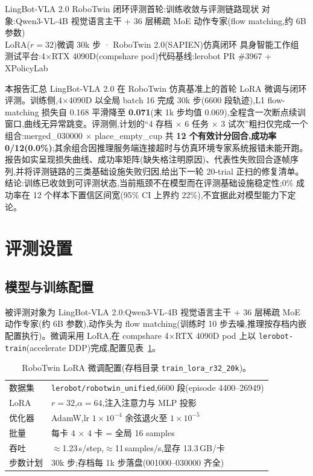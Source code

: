 \documentclass[11pt]{ctexart}
\begin{document}
{LingBot-VLA 2.0 RoboTwin 闭环评测首轮:训练收敛与评测链路现状}
{对象:Qwen3-VL-4B 视觉语言主干 + 36 层稀疏 MoE 动作专家(flow matching,约 6B 参数)\\ LoRA($r{=}32$)微调 30k 步 · RoboTwin 2.0(SAPIEN)仿真闭环}
{具身智能工作组 \quad 测试平台:4$\times$RTX 4090D(compshare pod)\quad 代码基线:lerobot PR \#3967 + XPolicyLab}

\begin{cnabstract}
本报告汇总 LingBot-VLA 2.0 在 RoboTwin 仿真基准上的首轮 LoRA 微调与闭环评测。训练侧,4$\times$4090D 以全局 batch 16 完成 30k 步(6600 段轨迹),L1 flow-matching 损失自 0.168 平滑降至 \textbf{0.071}(末 1k 步均值 0.069),全程含一次断点续训窗口,曲线无异常跳变。评测侧,计划的``4 存档 $\times$ 6 任务 $\times$ 3 试次''粗扫仅完成一个组合:merged\_030000 $\times$ place\_empty\_cup 共 \textbf{12 个有效计分回合,成功率 0/12(0.0\%)};其余组合因推理服务端连接超时与仿真环境专家系统报错未能开跑。报告如实呈现损失曲线、成功率矩阵(缺失格注明原因)、代表性失败回合逐帧序列,并将评测链路的三类基础设施失败归因,给出下一轮 20-trial 正扫的修复清单。结论:训练已收敛到可评测状态,当前瓶颈不在模型而在评测基础设施稳定性;0\% 成功率在 12 个样本下置信区间宽(95\% CI 上界约 22\%),不宜据此对模型能力下定论。
\end{cnabstract}

\section{评测设置}

\subsection{模型与训练配置}

被评测对象为 LingBot-VLA 2.0:Qwen3-VL-4B 视觉语言主干 + 36 层稀疏 MoE 动作专家(约 6B 参数),动作头为 flow matching(训练时 10 步去噪,推理按存档内嵌配置执行)。微调采用 LoRA,在 compshare 4$\times$RTX 4090D pod 上以 \texttt{lerobot-train}(accelerate DDP)完成,配置见表~\ref{tab:traincfg}。

\begin{table}[h]
\centering
\caption{RoboTwin LoRA 微调配置(存档目录 \texttt{train\_lora\_r32\_20k})。}
\label{tab:traincfg}
\small
\begin{tabular}{@{}ll@{}}
\toprule
数据集 & \texttt{lerobot/robotwin\_unified},6600 段(episode 4400--26949) \\
LoRA & $r{=}32$,$\alpha{=}64$,注入注意力与 MLP 投影 \\
优化器 & AdamW,lr $1\times10^{-4}$ 余弦退火至 $1\times10^{-5}$ \\
批量 & 每卡 4 $\times$ 4 卡 = 全局 16 samples \\
吞吐 & $\approx$1.23\,s/step,$\approx$11\,samples/s,显存 13.3\,GB/卡 \\
步数计划 & 30k 步;存档每 1k 步落盘(001000--030000 齐全) \\
\bottomrule
\end{tabular}
\end{table}
\end{document}
